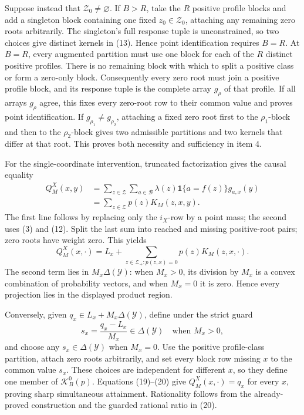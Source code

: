 Suppose instead that \(\mathcal Z_0\ne\varnothing\).  If \(B>R\), take
the \(R\) positive profile blocks and add a singleton block containing
one fixed \(z_0\in\mathcal Z_0\), attaching any remaining zero roots
arbitrarily.  The singleton's full response tuple is unconstrained, so
two choices give distinct kernels in (13).  Hence point identification
requires \(B=R\).  At \(B=R\), every augmented partition must use one
block for each of the \(R\) distinct positive profiles.  There is no
remaining block with which to split a positive class or form a zero-only
block.  Consequently every zero root must join a positive profile block,
and its response tuple is the complete array \(g_\rho\) of that profile.
If all arrays \(g_\rho\) agree, this fixes every zero-root row to their
common value and proves point identification.  If
\(g_{\rho_1}\ne g_{\rho_2}\), attaching a fixed zero root first to the
\(\rho_1\)-block and then to the \(\rho_2\)-block gives two admissible
partitions and two kernels that differ at that root.  This proves both
necessity and sufficiency in item 4.

For the single-coordinate intervention, truncated factorization gives
the causal equality
\[
\begin{aligned}
 Q_M^X(x,y)
 &=\sum_{z\in\mathcal Z}\sum_{a\in\mathcal B}
   \lambda(z)\mathbf 1\{a=f(z)\}g_{a,x}(y)\\
 &=\sum_{z\in\mathcal Z}p(z)K_M(z,x,y).
\end{aligned}
\tag{18}
\]
The first line follows by replacing only the \(i_X\)-row by a point mass;
the second uses (3) and (12).  Split the last sum into reached and missing
positive-root pairs; zero roots have weight zero.  This yields
\[
 Q_M^X(x,\cdot)
 =L_x+\sum_{z\in\mathcal Z_+:p(z,x)=0}p(z)K_M(z,x,\cdot).
\tag{19}
\]
The second term lies in \(M_x\Delta(\mathcal Y)\): when \(M_x>0\), its
division by \(M_x\) is a convex combination of probability vectors, and
when \(M_x=0\) it is zero.  Hence every projection lies in the displayed
product region.

Conversely, given \(q_x\in L_x+M_x\Delta(\mathcal Y)\), define under the
strict guard
\[
 s_x=\frac{q_x-L_x}{M_x}\in\Delta(\mathcal Y)
 \quad\text{when }M_x>0,
\tag{20}
\]
and choose any \(s_x\in\Delta(\mathcal Y)\) when \(M_x=0\).  Use the
positive profile-class partition, attach zero roots arbitrarily, and set
every block row missing \(x\) to the common value \(s_x\).  These choices
are independent for different \(x\), so they define one member of
\(\mathcal K_B^0(p)\).  Equations (19)--(20) give
\(Q_M^X(x,\cdot)=q_x\) for every \(x\), proving sharp simultaneous
attainment.  Rationality follows from the already-proved construction and
the guarded rational ratio in (20).

